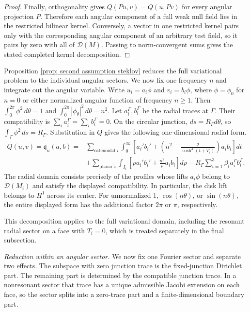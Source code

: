 \documentclass[11pt,twoside]{amsart}
\numberwithin{equation}{section}
\begin{document}
\begin{proof}
Finally, orthogonality gives $Q(Pu,v)=Q(u,Pv)$ for every angular projection $P$. Therefore each angular component of a full weak null field lies in the restricted bilinear kernel. Conversely, a vector in one restricted kernel pairs only with the corresponding angular component of an arbitrary test field, so it pairs by zero with all of $\mathcal D(M)$. Passing to norm-convergent sums gives the stated completed kernel decomposition.
\end{proof}

Proposition \ref{prop: second assumption steklov} reduces the full variational problem to the individual angular sectors. We now fix one frequency $n$ and integrate out the angular variable. Write $u_i=a_i\phi$ and $v_i=b_i\phi$, where $\phi=\phi_0$ for $n=0$ or either normalized angular function of frequency $n\geq1$. Then $\int_0^{2\pi}\phi^2\,d\theta=1$ and $\int_0^{2\pi}|\phi_\theta|^2\,d\theta=n^2$. Let $a_i^\Gamma,b_i^\Gamma$ be the radial traces at $\Gamma$. Their compatibility is $\sum_i a_i^\Gamma=\sum_i b_i^\Gamma=0$. On the circular junction, $ds=R_\Gamma d\theta$, so $\int_\Gamma\phi^2\,ds=R_\Gamma$. Substitution in $Q$ gives the following one-dimensional radial form.
\[
\begin{split}
Q(u,v)=\mathfrak q_n(a,b)
={}&\sum_{\text{catenoidal }i}\int_0^\infty
\left[a_i'b_i'+\left(n^2-\frac{2}{\cosh^2(t+T_i)}\right)a_ib_i\right]dt\\
&+\sum_{\text{planar }i}\int_{I_i}
\left[\rho a_i'b_i'+\frac{n^2}{\rho}a_ib_i\right]d\rho
-R_\Gamma\sum_{i=1}^3\beta_i a_i^\Gamma b_i^\Gamma.
\end{split}
\]
The radial domain consists precisely of the profiles whose lifts $a_i\phi$ belong to $\mathcal D(M_i)$ and satisfy the displayed compatibility. In particular, the disk lift belongs to $H^1$ across its center. For unnormalized $1$, $\cos(n\theta)$, or $\sin(n\theta)$, the entire displayed form has the additional factor $2\pi$ or $\pi$, respectively.

This decomposition applies to the full variational domain, including the resonant radial sector on a face with $T_i=0$, which is treated separately in the final subsection.

\medskip
\noindent\emph{Reduction within an angular sector.}
We now fix one Fourier sector and separate two effects. The subspace with zero junction trace is the fixed-junction Dirichlet part. The remaining part is determined by the compatible junction trace. In a nonresonant sector that trace has a unique admissible Jacobi extension on each face, so the sector splits into a zero-trace part and a finite-dimensional boundary part.
\end{document}

